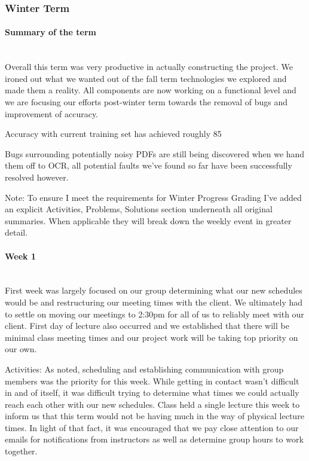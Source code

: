 \documentclass[article, onecolumn, draftclsnofoot,10pt, compsoc]{IEEEtran}
\begin{document}
\subsubsection{Winter Term}
\paragraph{Summary of the term}
\mbox{}\\
Overall this term was very productive in actually constructing the project. We ironed out what we wanted out of the fall term technologies we explored and made them a reality. All components are now working on a functional level and we are focusing our efforts post-winter term towards the removal of bugs and improvement of accuracy. 
 
Accuracy with current training set has achieved roughly 85%
 
Bugs surrounding potentially noisy PDFs are still being discovered when we hand them off to OCR, all potential faults we've found so far have been successfully resolved however.
 
Note: To ensure I meet the requirements for Winter Progress Grading I've added an explicit Activities, Problems, Solutions section underneath all original summaries. When applicable they will break down the weekly event in greater detail.


\paragraph{Week 1}
\mbox{}\\
First week was largely focused on our group determining what our new schedules would be and restructuring our meeting times with the client. We ultimately had to settle on moving our meetings to 2:30pm for all of us to reliably meet with our client. First day of lecture also occurred and we established that there will be minimal class meeting times and our project work will be taking top priority on our own.

Activities:
As noted, scheduling and establishing communication with group members was the priority for this week. While getting in contact wasn't difficult in and of itself, it was difficult trying to determine what times we could actually reach each other with our new schedules. Class held a single lecture this week to inform us that this term would not be having much in the way of physical lecture times. In light of that fact, it was encouraged that we pay close attention to our emails for notifications from instructors as well as determine group hours to work together.
 
\end{document}
